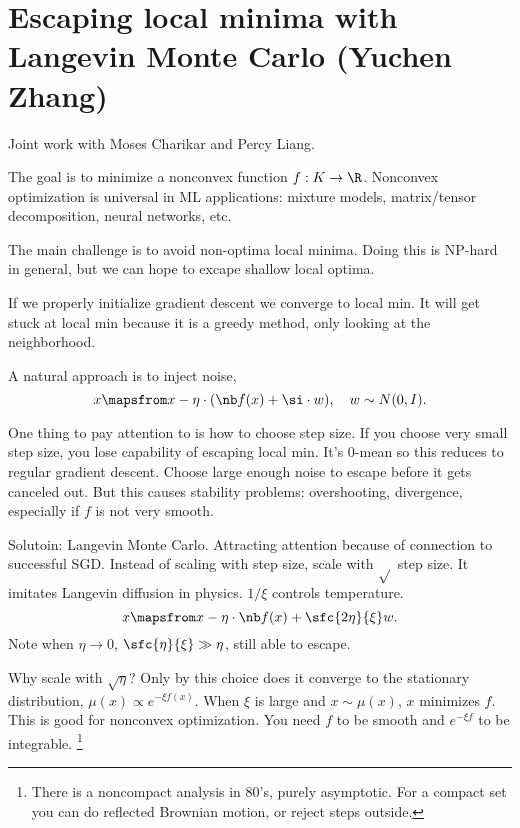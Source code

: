 \def\filepath{C:/Users/oldhe/Dropbox/Math/templates}






\pagestyle{fancy}
\chead{} 
\rhead{} 
\lfoot{} 
\cfoot{\thepage} 
\rfoot{} 
\renewcommand{\headrulewidth}{.3pt} 
\setlength\voffset{0in}
\setlength\textheight{648pt}




\section{Escaping local minima with Langevin Monte Carlo (Yuchen Zhang)}

Joint work with Moses Charikar and Percy Liang.

The goal is to minimize a nonconvex function $f:K\to \R$. Nonconvex optimization is universal in ML applications: mixture models, matrix/tensor decomposition, neural networks, etc.

The main challenge is to avoid non-optima local minima. Doing this is NP-hard in general, but we can hope to excape shallow local optima.

If we properly initialize gradient descent we converge to local min. It will get stuck at local min because it is a greedy method, only looking at the neighborhood.

A natural approach is to inject noise,
$$
x \mapsfrom x-\eta\cdot (\nb f(x) + \si\cdot w),\quad w\sim N(0,I).
$$

One thing to pay attention to is how to choose step size. If you choose very small step size, you lose capability of escaping local min. It's 0-mean so this reduces to regular gradient descent. Choose large enough noise to escape before it gets canceled out. But this causes stability problems: overshooting, divergence, especially if $f$ is not very smooth.

Solutoin: Langevin Monte Carlo. Attracting attention because of connection to successful SGD. Instead of scaling with step size, scale with $\sqrt{}$ step size. It imitates Langevin diffusion in physics. $1/\xi$ controls temperature.
$$
x\mapsfrom x -\eta\cdot \nb f(x) + \sfc{2\eta}{\xi} w.
$$
Note when $\eta\to 0$, $\sfc{\eta}{\xi}\gg \eta$, still able to escape.

Why scale with $\sqrt{\eta}$? Only by this choice does it converge to the stationary distribution, $\mu(x) \propto e^{-\xi f(x)}$. When $\xi$ is large and $x\sim \mu(x)$, $x$ minimizes $f$. 
This is good for nonconvex optimization.
You need $f$ to be smooth and $e^{-\xi f}$ to be integrable. %
\footnote{There is a noncompact analysis in 80's, purely asymptotic. For a compact set you can do reflected Brownian motion, or reject steps outside.} %

